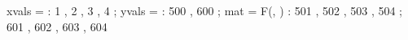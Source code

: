 \begin{functable}
    xvals = \alpha : 1  , 2  , 3  , 4 ;
    yvals = \beta  : 500 , 600 ;
    mat = {F(\alpha, \beta )} : 501 , 502 , 503 , 504 ;
                                601 , 602 , 603 , 604 
\end{functable}
